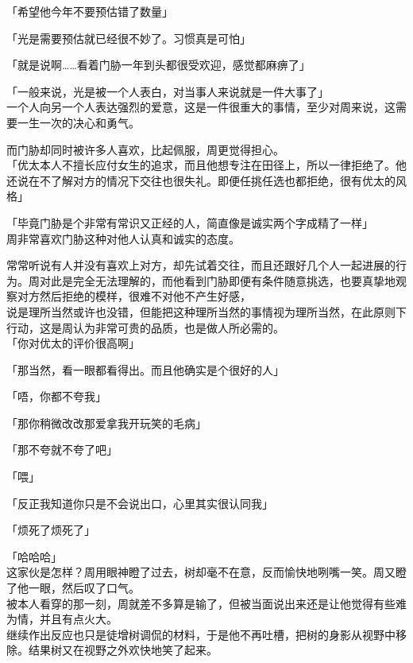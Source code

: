 「希望他今年不要预估错了数量」

「光是需要预估就已经很不妙了。习惯真是可怕」

「就是说啊……看着门胁一年到头都很受欢迎，感觉都麻痹了」

「一般来说，光是被一个人表白，对当事人来说就是一件大事了」\\

一个人向另一个人表达强烈的爱意，这是一件很重大的事情，至少对周来说，这需要一生一次的决心和勇气。

而门胁却同时被许多人喜欢，比起佩服，周更觉得担心。\\

「优太本人不擅长应付女生的追求，而且他想专注在田径上，所以一律拒绝了。他还说在不了解对方的情况下交往也很失礼。即便任挑任选也都拒绝，很有优太的风格」

「毕竟门胁是个非常有常识又正经的人，简直像是诚实两个字成精了一样」\\

周非常喜欢门胁这种对他人认真和诚实的态度。

常常听说有人并没有喜欢上对方，却先试着交往，而且还跟好几个人一起进展的行为。周对此是完全无法理解的，而他看到门胁即便有条件随意挑选，也要真挚地观察对方然后拒绝的模样，很难不对他不产生好感，\\

说是理所当然或许也没错，但能把这种理所当然的事情视为理所当然，在此原则下行动，这是周认为非常可贵的品质，也是做人所必需的。\\

「你对优太的评价很高啊」

「那当然，看一眼都看得出。而且他确实是个很好的人」

「唔，你都不夸我」

「那你稍微改改那爱拿我开玩笑的毛病」

「那不夸就不夸了吧」

「喂」

「反正我知道你只是不会说出口，心里其实很认同我」

「烦死了烦死了」

「哈哈哈」\\

这家伙是怎样？周用眼神瞪了过去，树却毫不在意，反而愉快地咧嘴一笑。周又瞪了他一眼，然后叹了口气。\\

被本人看穿的那一刻，周就差不多算是输了，但被当面说出来还是让他觉得有些难为情，并且有点火大。\\

继续作出反应也只是徒增树调侃的材料，于是他不再吐槽，把树的身影从视野中移除。结果树又在视野之外欢快地笑了起来。\\

